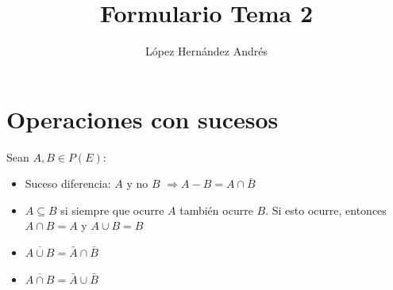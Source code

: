 \documentclass{pye-resumen}
\title{Formulario Tema 2}
\author{López Hernández Andrés}
\begin{document}
	\maketitle
	\section{Operaciones con sucesos}
	Sean $A,B \in P(E):$
	\begin{itemize}
		\item Suceso diferencia: $A$ y no $B$ $\Rightarrow A-B = A\cap\bar{B}$
		\item $A\subseteq B$ si siempre que ocurre $A$ también ocurre $B$. Si esto ocurre, entonces $A\cap B = A$ y $A \cup B = B$
		\item $\overline{A\cup B} = \bar{A} \cap \bar{B} $
		\item $\overline{A\cap B} = \bar{A} \cup \bar{B}$
	\end{itemize}
	
	
	
\end{document}
